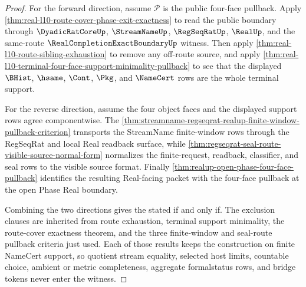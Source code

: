 \begin{proof}
For the forward direction, assume $\mathcal{P}$ is the public four-face
pullback. Apply
\autoref{thm:real-l10-route-cover-phase-exit-exactness} to read the public
boundary through $\DyadicRatCoreUp$, $\StreamNameUp$, $\RegSeqRatUp$,
$\RealUp$, and the same-route $\RealCompletionExactBoundaryUp$ witness.
Then apply \autoref{thm:real-l10-route-sibling-exhaustion} to remove any
off-route source, and apply
\autoref{thm:real-l10-terminal-four-face-support-minimality-pullback} to see
that the displayed $\BHist$, $\hsame$, $\Cont$, $\Pkg$, and $\NameCert$ rows
are the whole terminal support.

For the reverse direction, assume the four object faces and the displayed
support rows agree componentwise. The
\autoref{thm:streamname-regseqrat-realup-finite-window-pullback-criterion}
transports the StreamName finite-window rows through the RegSeqRat and local
Real readback surface, while
\autoref{thm:regseqrat-seal-route-visible-source-normal-form} normalizes the
finite-request, readback, classifier, and seal rows to the visible source
format. Finally
\autoref{thm:realup-open-phase-four-face-pullback} identifies the resulting
Real-facing packet with the four-face pullback at the open Phase Real
boundary.

Combining the two directions gives the stated if and only if. The exclusion
clauses are inherited from route exhaustion, terminal support minimality, the
route-cover exactness theorem, and the three finite-window and seal-route
pullback criteria just used. Each of those results keeps the construction on
finite NameCert support, so quotient stream equality, selected host limits,
countable choice, ambient or metric completeness, aggregate formalstatus
rows, and bridge tokens never enter the witness.
\end{proof}

